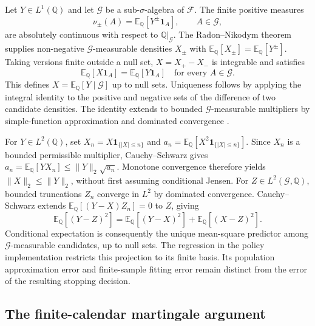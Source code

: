 \documentclass[11pt]{article}
\newcommand{\E}{\mathbb E}
\newcommand{\Q}{\mathbb Q}
\newcommand{\F}{\mathcal F}
\begin{document}
Let $Y\in L^1(\Q)$ and let $\mathcal G$ be a sub-$\sigma$-algebra of $\F$. The finite positive measures
\begin{equation}
 \nu_\pm(A)=\E_\Q[Y^\pm\mathbf1_A],\qquad A\in\mathcal G,
\end{equation}
are absolutely continuous with respect to $\Q|_{\mathcal G}$. The Radon--Nikodym theorem supplies non-negative $\mathcal G$-measurable densities $X_\pm$ with $\E_\Q[X_\pm]=\E_\Q[Y^\pm]$. Taking versions finite outside a null set, $X=X_+-X_-$ is integrable and satisfies
\begin{equation}
 \E_\Q[X\mathbf1_A]=\E_\Q[Y\mathbf1_A]
 \quad\text{for every }A\in\mathcal G.
\label{eq:foundation-ce-identity}
\end{equation}
This defines $X=\E_\Q[Y\mid\mathcal G]$ up to null sets. Uniqueness follows by applying the integral identity to the positive and negative sets of the difference of two candidate densities. The identity extends to bounded $\mathcal G$-measurable multipliers by simple-function approximation and dominated convergence \citep[Chapter~9]{williams1991}.

For $Y\in L^2(\Q)$, set $X_n=X\mathbf1_{\{|X|\leq n\}}$ and $a_n=\E_\Q[X^2\mathbf1_{\{|X|\leq n\}}]$. Since $X_n$ is a bounded permissible multiplier, Cauchy--Schwarz gives $a_n=\E_\Q[YX_n]\leq\|Y\|_2\sqrt{a_n}$. Monotone convergence therefore yields $\|X\|_2\leq\|Y\|_2$, without first assuming conditional Jensen. For $Z\in L^2(\mathcal G,\Q)$, bounded truncations $Z_n$ converge in $L^2$ by dominated convergence. Cauchy--Schwarz extends $\E_\Q[(Y-X)Z_n]=0$ to $Z$, giving
\begin{equation}
 \E_\Q[(Y-Z)^2]
 =\E_\Q[(Y-X)^2]+\E_\Q[(X-Z)^2].
\label{eq:foundation-projection}
\end{equation}
Conditional expectation is consequently the unique mean-square predictor among $\mathcal G$-measurable candidates, up to null sets. The regression in the policy implementation restricts this projection to its finite basis. Its population approximation error and finite-sample fitting error remain distinct from the error of the resulting stopping decision.

\subsection{The finite-calendar martingale argument}
\end{document}
